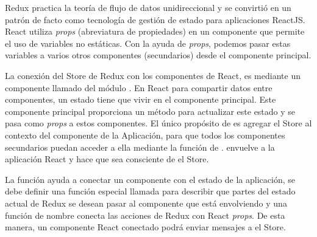 Redux practica la teoría de flujo de datos unidireccional y se convirtió en un patrón de facto como tecnología de gestión de estado para aplicaciones ReactJS. React utiliza \textit{props} (abreviatura de propiedades) en un componente que permite el uso de variables no estáticas. Con la ayuda de \textit{props}, podemos pasar estas variables a varios otros componentes (secundarios) desde el componente principal.
\vspace{0.8cm}

La conexión del Store de Redux con los componentes de React, es mediante un componente llamado  del módulo . En React para compartir datos entre componentes, un estado tiene que vivir en el componente principal. Este componente principal proporciona un método para actualizar este estado y se pasa como \textit{props} a estos componentes. El único propósito de  es agregar el Store al contexto del componente de la Aplicación, para que todos los componentes secundarios puedan acceder a ella mediante la función  de .  envuelve a la aplicación React y hace que sea consciente de el Store.
\vspace{0.8cm}



La función  ayuda a conectar un componente con el estado de la aplicación, se debe definir una función especial llamada  para describir que partes del estado actual de Redux se desean pasar al componente que está envolviendo y una función de nombre  conecta las acciones de Redux con React \textit{props}. De esta manera, un componente React conectado podrá enviar mensajes a el Store.
\vspace{0.8cm}



